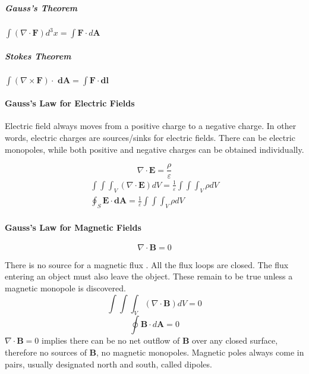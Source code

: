 \subparagraph{Gauss's Theorem} $\int (\nabla \cdot \textbf{F})d^{3}x = \int \textbf{F} \cdot d\textbf{A}$


\subparagraph{Stokes Theorem} $\int (\nabla \times \textbf{F}) \cdot \textbf{ dA} = \int \textbf{F} \cdot \textbf{dl}$





\paragraph{Gauss's Law for Electric Fields}

Electric field always moves from a positive charge to a negative charge. In other words, electric charges are sources/sinks for electric fields. There can be electric monopoles, while both positive and negative charges can be obtained individually.

\begin{equation}
	\nabla \cdot \textbf{E} = \frac{\rho}{\varepsilon}
\end{equation}
\begin{eqnarray}
	\int \int \int_{V} (\nabla \cdot \textbf{E}) dV = \frac{1}{\varepsilon} \int \int \int_{V} \rho dV \\
	\oint_{S} \textbf{E} \cdot \textbf{dA} = \frac{1}{\varepsilon} \int \int \int_{V} \rho dV
\end{eqnarray}




\paragraph{Gauss's Law for Magnetic Fields}
\begin{equation}
	\nabla \cdot \textbf{B} = 0
\end{equation}

There is no source for a magnetic flux \cite{Pyrhonen}. All the flux loops are closed. The flux entering an object must also leave the object. These remain to be true unless a magnetic monopole is discovered.
\begin{equation}
	\int \int \int_{V} (\nabla \cdot \textbf{B}) dV = 0
\end{equation}
\begin{equation}
	\oint \textbf{B} \cdot d\textbf{A} = 0
\end{equation}
	 $\nabla \cdot \textbf{B} = 0$ implies there can be no net outflow of $\textbf{B}$ over any  closed surface, therefore no sources of $\textbf{B}$, no magnetic monopoles. Magnetic poles always come in pairs, usually designated north 
and south, called dipoles.



